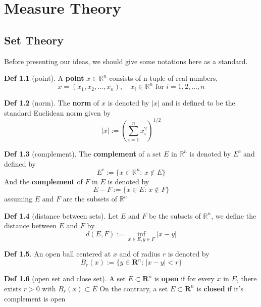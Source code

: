 \documentclass{ctexbook}
\begin{document}
\theoremstyle{definition} 
\newtheorem{define}{Def}[section]

\theoremstyle{plain} 
\newtheorem{thm}{Theorem}[section] \newtheorem{lema}{Lemma} \newtheorem{cor}{Corollary}
\newtheorem{prop}{Property} \newtheorem{fact}{Fact} 


\mainmatter
\chapter{Measure Theory}

\section{Set Theory}

Before presenting our ideas, we should give some notations here as a standard.
\begin{define}[point]
    A \textbf{point} $x \in \mathbb{R}^n$ consists of n-tuple of real numbers,
    \[x=(x_1,x_2,\ldots,x_n),\quad x_i \in \mathbb{R}^n \text{ for } i=1,2,\ldots,n\]
\end{define}
\begin{define}[norm]
    The \textbf{norm} of $x$ is denoted by $\left|x\right|$ and is defined to be the standard Euclidean norm given by 
    \[\left|x\right|:=(\sum\limits^n_{i=1}x_i^2)^{1/2}\]
\end{define}
\begin{define}[complement]
    The \textbf{complement} of a set $E$ in $\mathbb{R}^n$ is denoted by $E^c$ and defined by 
    \[E^c:=\{x\in \mathbb{R}^n:\, x \notin E\}\]
    And the \textbf{complement} of $F$ in $E$ is denoted by 
    \[E-F:=\{x \in E:\, x \notin F\}\]
    assuming $E$ and $F$ are the subsets of $\mathbb{R}^n$
\end{define}
\begin{define}[distance between sets]
    Let $E$ and $F$ be the subsets of $\mathbb{R}^n$, we define the distance between $E$ and $F$ by 
    \[d(E,F):=\inf\limits_{x\in E, y\in F}\left|x-y\right|\] 
\end{define}
\begin{define}
    An open ball centered at $x$ and of radius $r$ is denoted by 
    \[B_r(x):=\{y\in \mathbf{R}^n:\, \left|x-y\right|<r\}\]
\end{define}
\begin{define}[open set and close set]
    A set $E \subset \mathbf{R}^n$ is \textbf{open} if for every $x$ in $E$, there exists $r>0$ with $B_r(x) \subset E$
    On the contrary, a set $E \subset \mathbf{R}^n$ is \textbf{closed} if it's complement is open
\end{define}
\end{document}
